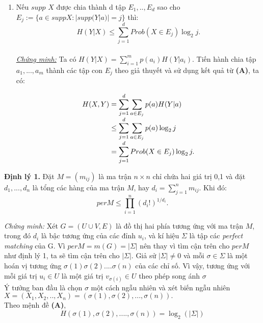 \documentclass[a4paper]{report}
\begin{document}
\begin{enumerate}[label=\textbf{(\Alph*)}]
\item 
	Nếu \(supp\) \(X\) được chia thành d tập \(E_{1},..,E_{d}\) sao cho \(E_{j}:= \{a \in suppX : |supp(Y|a)| = j \} \) thì:
\begin{equation*}
    H(Y|X) \leq \sum_{j=1}^{d}Prob(X \in E_{j})\log_{2}j.
\end{equation*}
\\
\textit{\underline{Chứng minh:}} Ta có $H(Y|X) = \displaystyle \sum_{i=1}^{m}p(a_{i})H(Y|a_{i}) $. Tiến hành chia tập ${a_{1},...,a_{m}}$ thành các tập con $E_{j}$ theo giả thuyết và sử dụng kết quả từ \textbf{(A)}, ta có:

\begin{equation*}
\begin{array}{l@{}l}
H(X,Y)
	&{}= \displaystyle \sum _{j=1}^{d}\sum_{a \in E_{j}}p(a)H(Y|a) \\
	&{} \leq \displaystyle \sum _{j=1}^{d}\sum_{a \in E_{j}}p(a)\log_{2}j \\
	&{} = \displaystyle \sum_{j=1}^{d}Prob(X \in E_{j})\log_{2}j.
\end{array}
\end{equation*}

\end{enumerate}





\textbf{Định lý 1.}  Đặt $M = (m_{ij})$ là ma trận $n \times n$ chỉ chứa hai giá trị 0,1 và đặt $d_{1},...,d_{n}$  là tổng các hàng của ma trận $M$, hay $d_{i} =  \displaystyle \sum _{j=1}^{n}m_{ij}$. Khi đó:
\begin{equation*}
    per M \leq \prod_{i=1}^{n}(d_{i}!)^{1/d_{i}}.
\end{equation*}

\textit{Chứng minh:} Xét $G=(U \cup V,E)$ là đồ thị hai phía tương ứng với ma trận $M$, trong đó $d_{i}$ là bậc tương ứng của các đỉnh $u_{i}$, và kí hiệu $\Sigma$ là tập các \textit{perfect matching} của G. Vì $per M=m(G) = |\Sigma|$ nên thay vì tìm cận trên cho $per M$ như định lý 1, ta sẽ tìm cận trên cho $|\Sigma|$. Giả sử $|\Sigma| \neq 0$ và mỗi $\sigma \in \Sigma$ là một hoán vị tương ứng $\sigma (1) \sigma (2) ....  \sigma (n)$ của các chỉ số. Vì vậy, tương ứng với mỗi giá trị $u_{i} \in U$ là một giá trị $v_{\sigma(i)} \in U$ theo phép song ánh $\sigma$
\\
Ý tưởng ban đầu là chọn $\sigma$ một cách ngẫu nhiên và xét biến ngẫu nhiên $X=(X_{1},X_{2},..,X_{n}) = (\sigma(1),\sigma(2),...,\sigma(n)).$
\\
Theo mệnh đề \textbf{(A)},
\begin{equation*}
H(\sigma (1), \sigma (2), ....  ,\sigma (n)) = \log_{2}(|\Sigma|)
\end{equation*}
\end{document}
